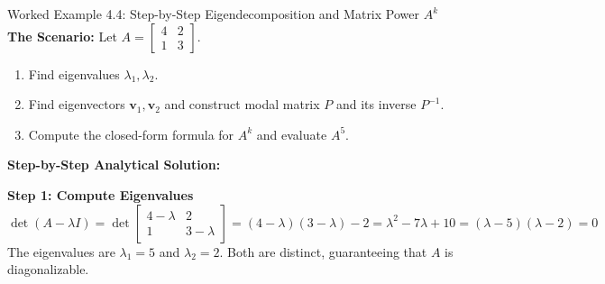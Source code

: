 \begin{examplebox}{Worked Example 4.4: Step-by-Step Eigendecomposition and Matrix Power $A^k$}
\label{ex:w04_matrix_power}
\textbf{The Scenario:}
Let $A = \begin{bmatrix} 4 & 2 \\ 1 & 3 \end{bmatrix}$. 
\begin{enumerate}
    \item Find eigenvalues $\lambda_1, \lambda_2$.
    \item Find eigenvectors $\mathbf{v}_1, \mathbf{v}_2$ and construct modal matrix $P$ and its inverse $P^{-1}$.
    \item Compute the closed-form formula for $A^k$ and evaluate $A^5$.
\end{enumerate}

\tcblower
\textbf{Step-by-Step Analytical Solution:}

\textbf{Step 1: Compute Eigenvalues}
\begin{equation*}
\det(A - \lambda I) = \det\begin{bmatrix} 4 - \lambda & 2 \\ 1 & 3 - \lambda \end{bmatrix} = (4 - \lambda)(3 - \lambda) - 2 = \lambda^2 - 7\lambda + 10 = (\lambda - 5)(\lambda - 2) = 0
\end{equation*}
The eigenvalues are $\lambda_1 = 5$ and $\lambda_2 = 2$. Both are distinct, guaranteeing that $A$ is diagonalizable.


\end{examplebox}
